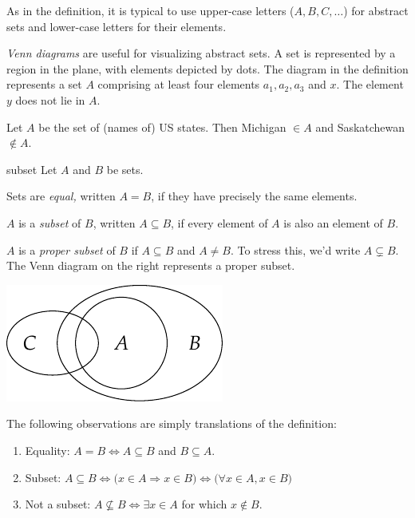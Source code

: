 As in the definition, it is typical to use upper-case letters ($A,B,C,\ldots$) for abstract sets and lower-case letters for their elements.\smallbreak

\emph{Venn diagrams} are useful for visualizing abstract sets. A set is represented by a region in the plane, with elements depicted by dots. The diagram in the definition represents a set $A$ comprising at least four elements $a_1,a_2,a_3$ and $x$. The element $y$ does not lie in $A$. 

\begin{example}{}{}
	Let $A$ be the set of (names of) US states. Then Michigan $\in A$ and Saskatchewan $\notin A$.
\end{example}

\begin{defn}{}{subset}
	Let $A$ and $B$ be sets.
	\begin{enumerate}
	  \item Sets are \emph{equal,} written $A=B$, if they have precisely the same elements.\par
	  \begin{minipage}[t]{0.74\linewidth}\vspace{-4pt}
	  	\item $A$ is a \emph{subset} of $B$, written $A\subseteq B$, if every element of $A$ is also an element of $B$.
	  	\item $A$ is a \emph{proper subset} of $B$ if $A\subseteq B$ and $A\neq B$. To stress this, we'd write $A\subsetneq B$. The Venn diagram on the right represents a proper subset. 
	  \end{minipage}
	  \hfill
	  \begin{minipage}[t]{0.25\linewidth}\vspace{-15pt}
			\flushright\includegraphics{sets-02-vennsubset}
	  \end{minipage}
	\end{enumerate}
\end{defn}

The following observations are simply translations of the definition:
\begin{enumerate}
  \item Equality: $A=B \iff A\subseteq B$ and $B\subseteq A$.
  \item Subset: $A\subseteq B \iff \bigl(x\in A\Longrightarrow x\in B\bigr) \iff \bigl(\forall x\in A, x\in B\bigr)$
  \item Not a subset: $A\nsubseteq B \iff \exists x\in A$ for which $x\notin B$.
\end{enumerate}


